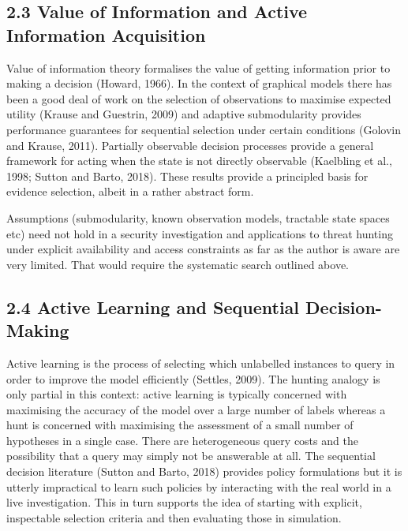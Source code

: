 \documentclass[a4paper,11pt]{article}
\begin{document}
\subsection{2.3 Value of Information and Active Information Acquisition}
Value of information theory formalises the value of getting information prior to making a decision (Howard, 1966). In the context of graphical models there has been a good deal of work on the selection of observations to maximise expected utility (Krause and Guestrin, 2009) and adaptive submodularity provides performance guarantees for sequential selection under certain conditions (Golovin and Krause, 2011). Partially observable decision processes provide a general framework for acting when the state is not directly observable (Kaelbling et al., 1998; Sutton and Barto, 2018). These results provide a principled basis for evidence selection, albeit in a rather abstract form.\par
Assumptions (submodularity, known observation models, tractable state spaces etc) need not hold in a security investigation and applications to threat hunting under explicit availability and access constraints as far as the author is aware are very limited. That would require the systematic search outlined above.\par
\subsection{2.4 Active Learning and Sequential Decision-Making}
Active learning is the process of selecting which unlabelled instances to query in order to improve the model efficiently (Settles, 2009). The hunting analogy is only partial in this context: active learning is typically concerned with maximising the accuracy of the model over a large number of labels whereas a hunt is concerned with maximising the assessment of a small number of hypotheses in a single case. There are heterogeneous query costs and the possibility that a query may simply not be answerable at all. The sequential decision literature (Sutton and Barto, 2018) provides policy formulations but it is utterly impractical to learn such policies by interacting with the real world in a live investigation. This in turn supports the idea of starting with explicit, inspectable selection criteria and then evaluating those in simulation.\par
\end{document}
